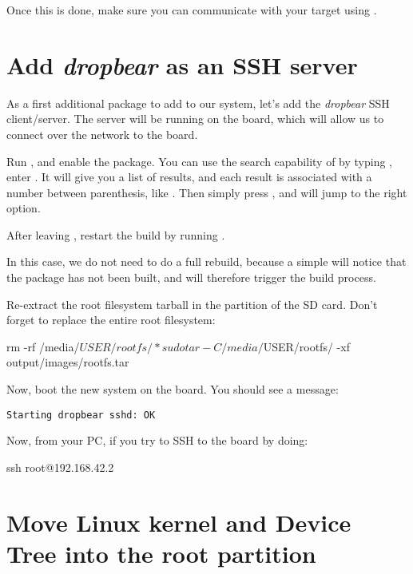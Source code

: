 Once this is done, make sure you can communicate with your target
using .

\section{Add {\em dropbear} as an SSH server}

As a first additional package to add to our system, let's add the {\em
  dropbear} SSH client/server. The server will be running on the
board, which will allow us to connect over the network to the board.

Run , and enable the 
package. You can use the search capability of  by
typing \code{/}, enter . It will give you a list of
results, and each result is associated with a number between
parenthesis, like . Then simply press , and
 will jump to the right option.

After leaving , restart the build by running
.

In this case, we do not need to do a full rebuild, because a simple
 will notice that the  package has not been
built, and will therefore trigger the build process.

Re-extract the root filesystem tarball in the  partition
of the SD card. Don't forget to replace the entire root filesystem:

\begin{bashinput}
rm -rf /media/$USER/rootfs/*
sudo tar -C /media/$USER/rootfs/ -xf output/images/rootfs.tar
\end{bashinput}

Now, boot the new system on the board. You should see a message:

\begin{verbatim}
Starting dropbear sshd: OK
\end{verbatim}

Now, from your PC, if you try to SSH to the board by doing:

\begin{bashinput}
ssh root@192.168.42.2
\end{bashinput}

\section{Move Linux kernel and Device Tree into the root partition}

